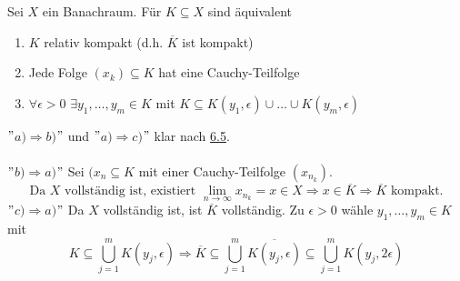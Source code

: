 \begin{kor}
	Sei $X$ ein Banachraum. Für $K \subseteq X$ sind äquivalent
	\begin{enumerate}[label=\alph*\upshape)]
		\item $K$ relativ kompakt (d.h. $\overline{K}$ ist kompakt)
		\item Jede Folge $(x_{k}) \subseteq K$ hat eine Cauchy-Teilfolge
		\item $\forall \epsilon > 0$ $\exists y_{1}, \dotsc, y_{m} \in K$ mit $K \subseteq K(y_{1}, \epsilon) \cup \dotsc \cup K(y_{m}, \epsilon)$
	\end{enumerate}
\end{kor}

\begin{beweis}
	$"$$a) \Rightarrow b)$$"$ und $"$$a) \Rightarrow c)$$"$ klar nach \hyperref[satz:6.5]{6.5}. \\ \\
	$"$$b) \Rightarrow a)$$"$ Sei $(x_{n} \subseteq K$ mit einer Cauchy-Teilfolge $(x_{n_{k}})$. \\
		\[ \text{Da } X \text{ vollständig ist, existiert } \lim_{n \rightarrow \infty} x_{n_{k}} = x \in X \Rightarrow x \in \overline{K} \Rightarrow \overline{K} \text{ kompakt.} \]
	$"$$c) \Rightarrow a)$$"$ Da $X$ vollständig ist, ist $\overline{K}$ vollständig. Zu $\epsilon > 0$ wähle $y_{1}, \dotsc, y_{m} \in K$ mit 
		\[ K \subseteq \bigcup_{j = 1}^{m} K(y_{j}, \epsilon) \Rightarrow \overline{K} \subseteq \bigcup_{j = 1}^{m} \overline{K(y_{j}, \epsilon)} \subseteq \bigcup_{j = 1}^{m} K(y_{j}, 2\epsilon) \]
\end{beweis}



\newpage